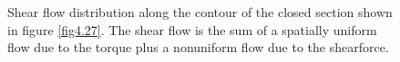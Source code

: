\documentclass{AeroStructure-ERJohnson}
\begin{document}
{\def\thefigure{4.28}
\begin{figure}
\caption{Shear flow distribution along the contour of the closed section shown in figure \ref{fig4.27}. The shear flow is the sum of a spatially uniform flow due to the torque plus a nonuniform flow due to the shear\break force.\label{fig4.28}}
\end{figure}}
\end{document}
